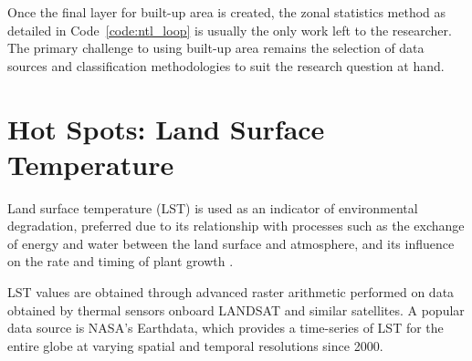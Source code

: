 \documentclass[12pt]{article}
\begin{document}
Once the final layer for built-up area is created, the zonal statistics method as detailed in Code~\ref{code:ntl_loop} is usually the only work left to the researcher. The primary challenge to using built-up area remains the selection of data sources and classification methodologies to suit the research question at hand. 


\section{Hot Spots: Land Surface Temperature}

Land surface temperature (LST) is used as an indicator of environmental degradation, preferred due to its relationship with processes such as the exchange of energy and water between the land surface and atmosphere, and its influence on the rate and timing of plant growth \parencite{esa}. 

LST values are obtained through advanced raster arithmetic \parencite{jimenez2003} performed on data obtained by thermal sensors onboard LANDSAT and similar satellites. A popular data source is NASA's Earthdata, which provides a time-series of LST for the entire globe at varying spatial and temporal resolutions since 2000.

\end{document}
